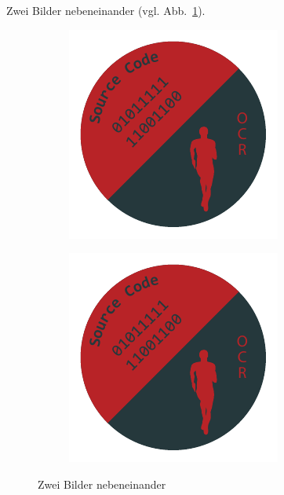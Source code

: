 Zwei Bilder nebeneinander (vgl. Abb.~\ref{fig:subfigure}). 
\begin{figure}
	\centering
	\begin{subfigure}[b]{0.2\textwidth}
		\centering
		\includegraphics[width=\textwidth]{content/bsp/logo.pdf}
	\end{subfigure}
	\begin{subfigure}[b]{0.2\textwidth}
		\centering
		\includegraphics[width=\textwidth]{content/bsp/logo.pdf}
	\end{subfigure}
	\caption{Zwei Bilder nebeneinander}\label{fig:subfigure}
\end{figure}

